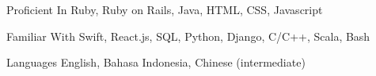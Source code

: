 


\begin{cvskills}


	\cvskill
	{Proficient In}
	{Ruby, Ruby on Rails, Java, HTML, CSS, Javascript}


	\cvskill
	{Familiar With}
	{Swift, React.js, SQL, Python, Django, C/C++, Scala, Bash}


	\cvskill
	{Languages}
	{English, Bahasa Indonesia, Chinese (intermediate)}


\end{cvskills}
